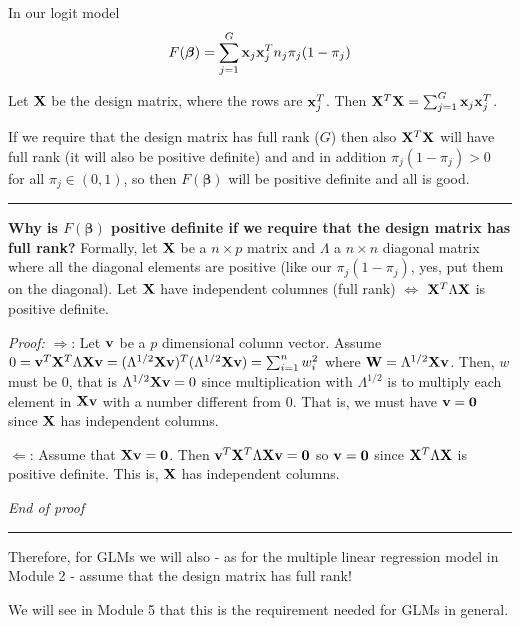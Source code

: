 \documentclass[
]{article}
\begin{document}
In our logit model
\[F(\boldsymbol{\beta})=\sum_{j=1}^G {\bf x}_j {\bf x}_j^T n_j \pi_j (1-\pi_j)\]

Let \({\bf X}\) be the design matrix, where the rows are
\({\bf x}_j^T\). Then
\({\bf X}^T{\bf X}=\sum_{j=1}^G {\bf x}_j {\bf x}_j^T\).

If we require that the design matrix has full rank (\(G\)) then also
\({\bf X}^T{\bf X}\) will have full rank (it will also be positive
definite) and and in addition \(\pi_j(1-\pi_j)>0\) for all
\(\pi_j \in (0,1)\), so then \(F(\boldsymbol{\beta})\) will be positive
definite and all is good.

\begin{center}\rule{0.5\linewidth}{0.5pt}\end{center}

\textbf{Why is \(F(\boldsymbol{\beta})\) positive definite if we require
that the design matrix has full rank?} Formally, let \({\bf X}\) be a
\(n\times p\) matrix and \(\Lambda\) a \(n\times n\) diagonal matrix
where all the diagonal elements are positive (like our
\(\pi_j(1-\pi_j)\), yes, put them on the diagonal). Let \({\bf X}\) have
independent columnes (full rank) \(\Leftrightarrow\)
\({\bf X}^T\Lambda{\bf X}\) is positive definite.

\emph{Proof:} \(\Rightarrow\): Let \({\bf v}\) be a \(p\) dimensional
column vector. Assume
\(0={\bf v}^T {\bf X}^T \Lambda {\bf X} {\bf v}=(\Lambda^{1/2}{\bf X}{\bf v})^T(\Lambda^{1/2}{\bf X}{\bf v})=\sum_{i=1}^n w_i^2\)
where \({\bf W}=\Lambda^{1/2}{\bf X}{\bf v}\). Then, \(w\) must be 0,
that is \(\Lambda^{1/2}{\bf X}{\bf v}=0\) since multiplication with
\(\Lambda^{1/2}\) is to multiply each element in \({\bf X}{\bf v}\) with
a number different from 0. That is, we must have \({\bf v}={\bf 0}\)
since \({\bf X}\) has independent columns.

\(\Leftarrow\): Assume that \({\bf X}{\bf v}={\bf 0}\). Then
\({\bf v}^T {\bf X}^T \Lambda {\bf X} {\bf v}={\bf 0}\) so
\({\bf v}={\bf 0}\) since \({\bf X}^T\Lambda{\bf X}\) is positive
definite. This is, \({\bf X}\) has independent columns.

\emph{End of proof}

\begin{center}\rule{0.5\linewidth}{0.5pt}\end{center}

Therefore, for GLMs we will also - as for the multiple linear regression
model in Module 2 - assume that the design matrix has full rank!

We will see in Module 5 that this is the requirement needed for GLMs in
general.
\end{document}
